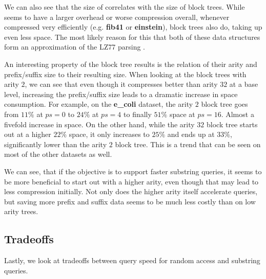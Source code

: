 \documentclass{scrartcl}
\begin{document}
We can also see that the size of \lzend{} correlates with the size of block trees.
While \lzend{} seems to have a larger overhead or worse compression overall, whenever \lzend{} compressed very efficiently (e.g. \textbf{fib41} or \textbf{einstein}),
block trees also do, taking up even less space.
The most likely reason for this that both of these data structures form an approximation of the LZ77 parsing \cite{ziv_universal_1977,belazzougui_block_2021,kempa_lz-end_2017}.

An interesting property of the block tree results is the relation of their arity and prefix/suffix size to their resulting size.
When looking at the block trees with arity $2$, we can see that even though it compresses better than arity $32$ at a base level,
increasing the prefix/suffix size leads to a dramatic increase in space consumption.
For example, on the \textbf{e\_coli} dataset, the arity $2$ block tree goes from $11\%$ at $ps = 0$ to $24\%$ at $ps=4$ to finally $51\%$ space at $ps=16$.
Almost a fivefold increase in space.
On the other hand, while the arity $32$ block tree starts out at a higher $22\%$ space, it only increases to $25\%$ and ends up at $33\%$, significantly lower than the arity $2$ block tree.
This is a trend that can be seen on most of the other datasets as well.

We can see, that if the objective is to support faster substring queries, it seems to be more beneficial to start out with a higher arity, even though that may lead to less compression initially.
Not only does the higher arity itself accelerate queries, but saving more prefix and suffix data seems to be much less costly than on low arity trees.

\subsection{Tradeoffs}

Lastly, we look at tradeoffs between query speed for random access and substring queries.
\end{document}
